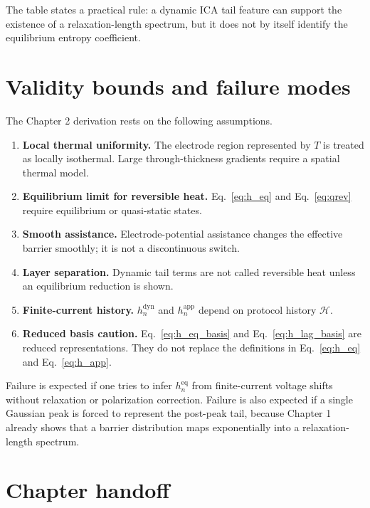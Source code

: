 \documentclass[11pt,a4paper]{article}
\newcommand{\eqs}{\mathrm{eq}}
\newcommand{\dyn}{\mathrm{dyn}}
\newcommand{\app}{\mathrm{app}}
\newcommand{\calH}{\mathcal H}
\begin{document}
The table states a practical rule: a dynamic ICA tail feature can support the existence of a relaxation-length
spectrum, but it does not by itself identify the equilibrium entropy coefficient.

\section{Validity bounds and failure modes}\label{sec:validity}

The Chapter 2 derivation rests on the following assumptions.

\begin{enumerate}[leftmargin=2em]
\item \textbf{Local thermal uniformity.} The electrode region represented by \(T\) is treated as locally
      isothermal. Large through-thickness gradients require a spatial thermal model.
\item \textbf{Equilibrium limit for reversible heat.} Eq.~\eqref{eq:h_eq} and Eq.~\eqref{eq:qrev} require
      equilibrium or quasi-static states.
\item \textbf{Smooth assistance.} Electrode-potential assistance changes the effective barrier smoothly; it
      is not a discontinuous switch.
\item \textbf{Layer separation.} Dynamic tail terms are not called reversible heat unless an equilibrium
      reduction is shown.
\item \textbf{Finite-current history.} \(h_n^{\dyn}\) and \(h_n^{\app}\) depend on protocol history \(\calH\).
\item \textbf{Reduced basis caution.} Eq.~\eqref{eq:h_eq_basis} and Eq.~\eqref{eq:h_lag_basis} are reduced
      representations. They do not replace the definitions in Eq.~\eqref{eq:h_eq} and Eq.~\eqref{eq:h_app}.
\end{enumerate}

Failure is expected if one tries to infer \(h_n^{\eqs}\) from finite-current voltage shifts without relaxation
or polarization correction. Failure is also expected if a single Gaussian peak is forced to represent the
post-peak tail, because Chapter 1 already shows that a barrier distribution maps exponentially into a
relaxation-length spectrum.

\section{Chapter handoff}\label{sec:next}
\end{document}
